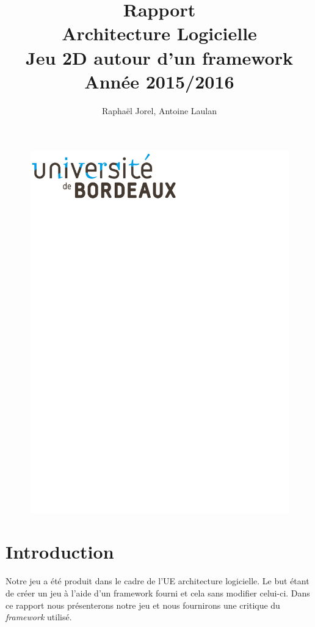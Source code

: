 \documentclass[a4paper,10pt]{article}
\title{Rapport\\Architecture Logicielle\\Jeu 2D autour d'un framework\\Année 2015/2016 }
\author{Raphaël Jorel, Antoine Laulan}
\begin{document}
\begin{figure}
    \begin{center}
    \includegraphics[scale=0.7]{images/logo-bdx.pdf}
    \end{center}
\end{figure}
\maketitle




\newpage
\section{Introduction }
Notre jeu a été produit dans le cadre de l'UE architecture logicielle. Le but étant de créer un jeu à l'aide
d'un framework fourni et cela sans modifier celui-ci.
Dans ce rapport nous présenterons notre jeu et nous fournirons une critique du \textit{framework} utilisé. \\
\end{document}
